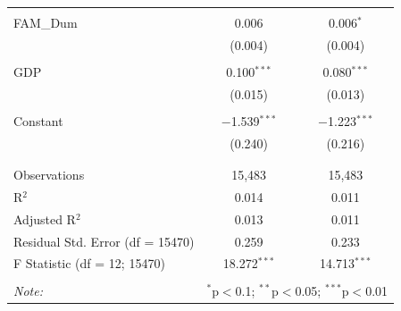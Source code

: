 \documentclass[a4paper,14pt]{article}\usepackage[]{graphicx}\usepackage[]{color}
\begin{document}
\begin{table}[!htbp]
\begin{tabular}{@{\extracolsep{5pt}}lcc}
  & & \\ 
 FAM\_Dum & 0.006 & 0.006$^{*}$ \\ 
  & (0.004) & (0.004) \\ 
  & & \\ 
 GDP & 0.100$^{***}$ & 0.080$^{***}$ \\ 
  & (0.015) & (0.013) \\ 
  & & \\ 
 Constant & $-$1.539$^{***}$ & $-$1.223$^{***}$ \\ 
  & (0.240) & (0.216) \\ 
  & & \\ 
\hline \\[-1.8ex] 
Observations & 15,483 & 15,483 \\ 
R$^{2}$ & 0.014 & 0.011 \\ 
Adjusted R$^{2}$ & 0.013 & 0.011 \\ 
Residual Std. Error (df = 15470) & 0.259 & 0.233 \\ 
F Statistic (df = 12; 15470) & 18.272$^{***}$ & 14.713$^{***}$ \\ 
\hline 
\hline \\[-1.8ex] 
\textit{Note:}  & \multicolumn{2}{r}{$^{*}$p$<$0.1; $^{**}$p$<$0.05; $^{***}$p$<$0.01} \\ 
\end{tabular} 
\end{table} 


\newpage
\end{document}
